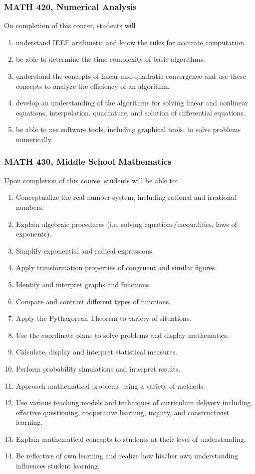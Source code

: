\documentclass[11pt]{article}
\newenvironment{alphalist}{
  \begin{enumerate}[(1)]
    \addtolength{\itemsep}{-1.0\itemsep}}
  {\end{enumerate}}
\begin{document}
\subsubsection*{MATH 420, Numerical Analysis}

On completion of this course, students will
\begin{alphalist}
    \item understand IEEE arithmetic and know the rules for accurate computation.
    \item be able to determine the time complexity of basic algorithms.
    \item understand the concepts of linear and quadratic convergence and use these concepts to analyze the efficiency of an algorithm.
    \item develop an understanding of the algorithms for solving linear and nonlinear equations, interpolation, quadrature, and solution of differential equations.
    \item be able to use software tools, including graphical tools, to solve problems numerically.
\end{alphalist}

\subsubsection*{MATH 430,  Middle School Mathematics}

Upon completion of this course, students will be able to: 
\begin{alphalist}
\item Conceptualize the real number system, including rational and irrational numbers. 
\item Explain algebraic procedures (i.e. solving equations/inequalities, laws of exponents). 
\item Simplify exponential and radical expressions. 
\item Apply transformation properties of congruent and similar figures. 
\item Identify and interpret graphs and functions. 
\item Compare and contrast different types of functions. 
\item Apply the Pythagorean Theorem to variety of situations. 
\item Use the coordinate plane to solve problems and display mathematics. 
\item Calculate, display and interpret statistical measures. 
\item Perform probability simulations and interpret results. 
\item Approach mathematical problems using a variety of methods. 
\item Use various teaching models and techniques of curriculum delivery including effective questioning, cooperative learning, inquiry, and constructivist learning. 
\item Explain mathematical concepts to students at their level of understanding. 
\item Be reflective of own learning and realize how his/her own understanding influences student learning.
\end{alphalist}
\end{document}
